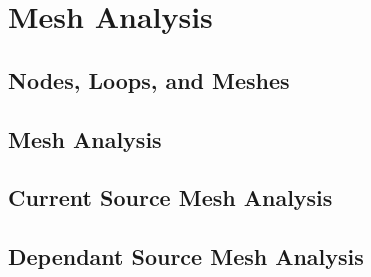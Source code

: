 \chapter{Mesh Analysis}
\label{cha:mesh_analysis}
    \section{Nodes, Loops, and Meshes}
    \section{Mesh Analysis}
    \section{Current Source Mesh Analysis}
    \section{Dependant Source Mesh Analysis}